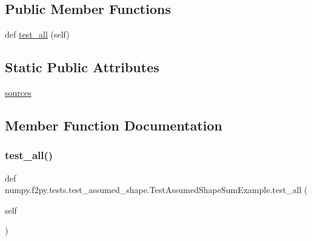 \subsection*{Public Member Functions}
\begin{DoxyCompactItemize}
\item 
def \hyperlink{classnumpy_1_1f2py_1_1tests_1_1test__assumed__shape_1_1TestAssumedShapeSumExample_a300cd0a786ed1cf7f7aa88fb2ab6b835}{test\+\_\+all} (self)
\end{DoxyCompactItemize}
\subsection*{Static Public Attributes}
\begin{DoxyCompactItemize}
\item 
\hyperlink{classnumpy_1_1f2py_1_1tests_1_1test__assumed__shape_1_1TestAssumedShapeSumExample_a54b1c61f2de742207bdd1a3e8fc37540}{sources}
\end{DoxyCompactItemize}


\subsection{Member Function Documentation}
\mbox{\label{classnumpy_1_1f2py_1_1tests_1_1test__assumed__shape_1_1TestAssumedShapeSumExample_a300cd0a786ed1cf7f7aa88fb2ab6b835}} 
\subsubsection{\texorpdfstring{test\+\_\+all()}{test\_all()}}
{\footnotesize\ttfamily def numpy.\+f2py.\+tests.\+test\+\_\+assumed\+\_\+shape.\+Test\+Assumed\+Shape\+Sum\+Example.\+test\+\_\+all (\begin{DoxyParamCaption}\item[{}]{self }\end{DoxyParamCaption})}



